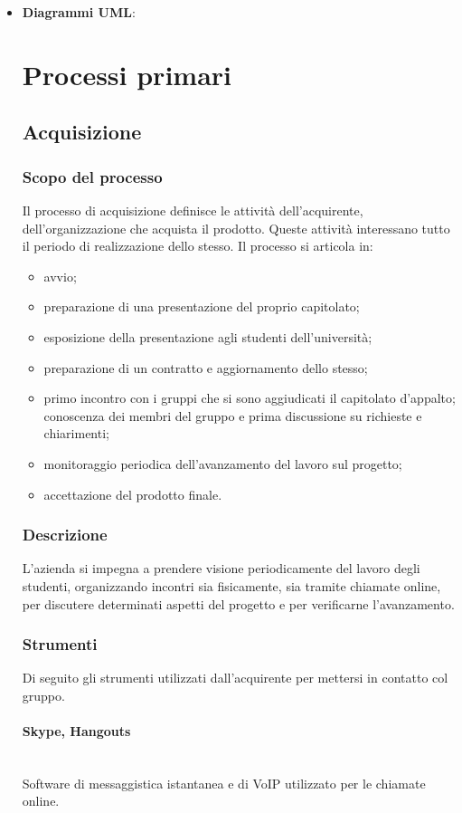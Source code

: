 			\begin{itemize}
				\item \textbf{Diagrammi UML}:\section{Processi primari}
\subsection{Acquisizione}
\subsubsection{Scopo del processo}
Il processo di acquisizione definisce le attività dell'acquirente, 
dell'organizzazione che acquista il prodotto. Queste attività interessano tutto 
il periodo di realizzazione dello stesso.
Il processo si articola in:
\begin{itemize}
	\item avvio;
	\item preparazione di una presentazione del proprio capitolato;
	\item esposizione della presentazione agli studenti dell'università;
	\item preparazione di un contratto e aggiornamento dello stesso;
	\item primo incontro con i gruppi che si sono aggiudicati il capitolato 
d'appalto; conoscenza dei membri del gruppo e prima discussione su richieste e 
chiarimenti;
	\item monitoraggio periodica dell'avanzamento del lavoro sul progetto;
	\item accettazione del prodotto finale.
\end{itemize}

\subsubsection{Descrizione}
L'azienda si impegna a prendere visione periodicamente del lavoro degli studenti, organizzando incontri sia fisicamente, sia tramite chiamate online,
per discutere determinati aspetti del progetto e per verificarne l'avanzamento.
\subsubsection{Strumenti}
Di seguito gli strumenti utilizzati dall'acquirente per mettersi in contatto col gruppo.
\paragraph{Skype, Hangouts} \mbox{}\\
Software di messaggistica istantanea e di VoIP utilizzato per le chiamate online. 

\end{itemize}
